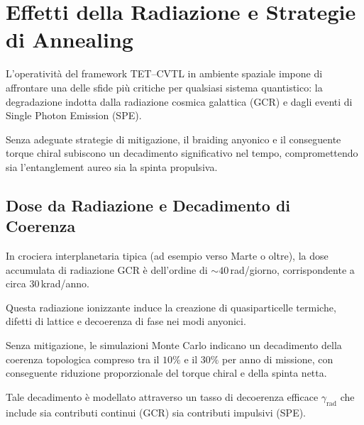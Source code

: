 \documentclass[11pt,a4paper]{article}
\theoremstyle{plain}
\theoremstyle{definition}
\begin{document}
\vspace{0.4cm}


\section{Effetti della Radiazione e Strategie di Annealing}

L'operatività del framework TET--CVTL in ambiente spaziale impone di affrontare una delle sfide più critiche per qualsiasi sistema quantistico: la degradazione indotta dalla radiazione cosmica galattica (GCR) e dagli eventi di Single Photon Emission (SPE). 

\vspace{0.3cm}

Senza adeguate strategie di mitigazione, il braiding anyonico e il conseguente torque chiral subiscono un decadimento significativo nel tempo, compromettendo sia l'entanglement aureo sia la spinta propulsiva.


\vspace{0.3cm}


\subsection{Dose da Radiazione e Decadimento di Coerenza}

In crociera interplanetaria tipica (ad esempio verso Marte o oltre), la dose accumulata di radiazione GCR è dell'ordine di $\sim 40$\,rad/giorno, corrispondente a circa $30$\,krad/anno. 

\vspace{0.3cm}


Questa radiazione ionizzante induce la creazione di quasiparticelle termiche, difetti di lattice e decoerenza di fase nei modi anyonici.

\vspace{0.3cm}

Senza mitigazione, le simulazioni Monte Carlo indicano un decadimento della coerenza topologica compreso tra il $10\%$ e il $30\%$ per anno di missione, con conseguente riduzione proporzionale del torque chiral e della spinta netta. 

\vspace{0.3cm}


Tale decadimento è modellato attraverso un tasso di decoerenza efficace $\gamma_{\text{rad}}$ che include sia contributi continui (GCR) sia contributi impulsivi (SPE).


\vspace{0.3cm}
\end{document}
